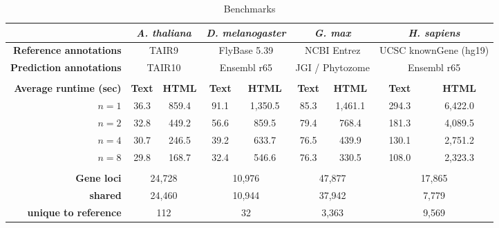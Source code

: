 \begin{table}
\caption{Benchmarks}
\begin{tabularx}{\textwidth}{rc cc cc cc c}
\hline
  & \multicolumn{2}{c}{\textit{A. thaliana}} & \multicolumn{2}{c}{\textit{D. melanogaster}} & \multicolumn{2}{c}{\textit{G. max}} & \multicolumn{2}{c}{\textit{H. sapiens}} \\ \hline
 \textbf{Reference annotations} & \multicolumn{2}{c}{TAIR9} & \multicolumn{2}{c}{FlyBase 5.39} & \multicolumn{2}{c}{NCBI Entrez} & \multicolumn{2}{c}{UCSC knownGene (hg19)} \\
 \textbf{Prediction annotations} & \multicolumn{2}{c}{TAIR10} & \multicolumn{2}{c}{Ensembl r65} & \multicolumn{2}{c}{JGI / Phytozome} & \multicolumn{2}{c}{Ensembl r65} \\ \hline
 \multicolumn{9}{c}{} \\ \hline
 \textbf{Average runtime (sec)} & \textbf{Text} & \textbf{HTML} & \textbf{Text} & \textbf{HTML} & \textbf{Text} & \textbf{HTML} & \textbf{Text} & \textbf{HTML} \\ \hline
 {\scriptsize $n=1$} & {\scriptsize 36.3} & {\scriptsize 859.4} & {\scriptsize 91.1} & {\scriptsize 1,350.5} & {\scriptsize 85.3} & {\scriptsize 1,461.1} & {\scriptsize 294.3} & {\scriptsize 6,422.0} \\
 {\scriptsize $n=2$} & {\scriptsize 32.8} & {\scriptsize 449.2} & {\scriptsize 56.6} & {\scriptsize 859.5} & {\scriptsize 79.4} & {\scriptsize 768.4} & {\scriptsize 181.3} & {\scriptsize 4,089.5}     \\
 {\scriptsize $n=4$} & {\scriptsize 30.7} & {\scriptsize 246.5} & {\scriptsize 39.2} & {\scriptsize 633.7} & {\scriptsize 76.5} & {\scriptsize 439.9} & {\scriptsize 130.1} & {\scriptsize 2,751.2}     \\
 {\scriptsize $n=8$} & {\scriptsize 29.8} & {\scriptsize 168.7} & {\scriptsize 32.4} & {\scriptsize 546.6} & {\scriptsize 76.3} & {\scriptsize 330.5} & {\scriptsize 108.0} & {\scriptsize 2,323.3}     \\ \hline
 \multicolumn{9}{c}{} \\ \hline
 \textbf{Gene loci} & \multicolumn{2}{c}{24,728} & \multicolumn{2}{c}{10,976} & \multicolumn{2}{c}{47,877} & \multicolumn{2}{c}{17,865} \\ \hline
 {\scriptsize \textbf{shared}} & \multicolumn{2}{c}{{\scriptsize 24,460}} & \multicolumn{2}{c}{{\scriptsize 10,944}} & \multicolumn{2}{c}{{\scriptsize 37,942}} & \multicolumn{2}{c}{{\scriptsize 7,779}} \\
 {\scriptsize \textbf{unique to reference}} & \multicolumn{2}{c}{{\scriptsize 112}} & \multicolumn{2}{c}{{\scriptsize 32}} & \multicolumn{2}{c}{{\scriptsize 3,363}} & \multicolumn{2}{c}{{\scriptsize 9,569}} \\

\end{tabularx}
\end{table}
